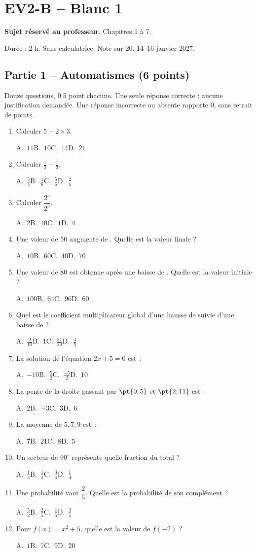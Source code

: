 \mxnewpage\section*{EV2-B -- Blanc 1}\label{EV2-B}
\textbf{Sujet réservé au professeur}. Chapitres 1 à 7.\par Durée : 2 h. Sans calculatrice. Note sur 20. 14–16 janvier 2027.
\subsection*{Partie 1 -- Automatismes (6 points)}
Douze questions, \num{0,5} point chacune. Une seule réponse correcte ; aucune justification demandée. Une réponse incorrecte ou absente rapporte 0, sans retrait de points.
\begin{enumerate}
\item Calculer $5+2\times3$.\par A.~$11$\quad B.~$10$\quad C.~$14$\quad D.~$21$
\item Calculer $\frac12+\frac13$.\par A.~$\frac{5}{3}$\quad B.~$\frac{1}{6}$\quad C.~$\frac{5}{6}$\quad D.~$\frac{2}{5}$
\item Calculer $\dfrac{2^5}{2^{3}}$.\par A.~$2$\quad B.~$10$\quad C.~$1$\quad D.~$4$
\item Une valeur de 50 augmente de . Quelle est la valeur finale ?\par A.~$10$\quad B.~$60$\quad C.~$40$\quad D.~$70$
\item Une valeur de 80 est obtenue après une baisse de . Quelle est la valeur initiale ?\par A.~$100$\quad B.~$64$\quad C.~$96$\quad D.~$60$
\item Quel est le coefficient multiplicateur global d'une hausse de  suivie d'une baisse de  ?\par A.~$\frac{9}{10}$\quad B.~$1$\quad C.~$\frac{21}{20}$\quad D.~$\frac{4}{5}$
\item La solution de l'équation $2x+5=0$ est~:\par A.~$-10$\quad B.~$\frac{5}{2}$\quad C.~$\frac{-5}{2}$\quad D.~$10$
\item La pente de la droite passant par $\pt{0;5}$ et $\pt{2;11}$ est~:\par A.~$2$\quad B.~$-3$\quad C.~$3$\quad D.~$6$
\item La moyenne de $5, 7, 9$ est~:\par A.~$7$\quad B.~$21$\quad C.~$8$\quad D.~$5$
\item Un secteur de $90^\circ$ représente quelle fraction du total ?\par A.~$\frac{1}{3}$\quad B.~$\frac{1}{2}$\quad C.~$\frac{3}{4}$\quad D.~$\frac{1}{4}$
\item Une probabilité vaut $\dfrac{2}{5}$. Quelle est la probabilité de son complément ?\par A.~$\frac{5}{2}$\quad B.~$\frac{2}{5}$\quad C.~$\frac{1}{5}$\quad D.~$\frac{3}{5}$
\item Pour $f(x)=x^2+5$, quelle est la valeur de $f(-2)$ ?\par A.~$1$\quad B.~$7$\quad C.~$9$\quad D.~$20$
\end{enumerate}
